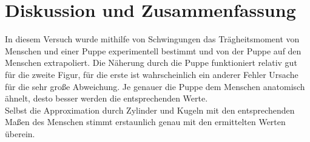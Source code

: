 \section{Diskussion und Zusammenfassung}
In diesem Versuch wurde mithilfe von Schwingungen das Trägheitsmoment von Menschen und einer Puppe experimentell bestimmt und von der Puppe auf den Menschen extrapoliert. Die Näherung durch die Puppe funktioniert relativ gut für die zweite Figur, für die erste ist wahrscheinlich ein anderer Fehler Ursache für die sehr große Abweichung. Je genauer die Puppe dem Menschen anatomisch ähnelt, desto besser werden die entsprechenden Werte.\\
Selbst die Approximation durch Zylinder und Kugeln mit den entsprechenden Maßen des Menschen stimmt erstaunlich genau mit den ermittelten Werten überein.